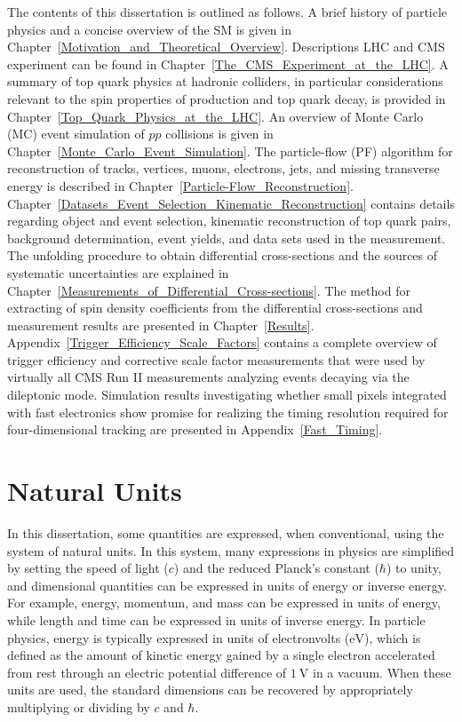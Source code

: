The contents of this dissertation is outlined as follows.
A brief history of particle physics and a concise overview of the SM is given in Chapter~\ref{Motivation_and_Theoretical_Overview}.
Descriptions LHC and CMS experiment can be found in Chapter~\ref{The_CMS_Experiment_at_the_LHC}.
A summary of top quark physics at hadronic colliders, in particular considerations relevant to the spin properties of \ttbar production and top quark decay, is provided in Chapter~\ref{Top_Quark_Physics_at_the_LHC}. 
An overview of Monte Carlo (MC) event simulation of $pp$ collisions is given in Chapter~\ref{Monte_Carlo_Event_Simulation}.
The particle-flow (PF) algorithm for reconstruction of tracks, vertices, muons, electrons, jets, and missing transverse energy is described in Chapter~\ref{Particle-Flow_Reconstruction}.
Chapter~\ref{Datasets_Event_Selection_Kinematic_Reconstruction} contains details regarding object and event selection, kinematic reconstruction of top quark pairs, background determination, event yields, and data sets used in the measurement.
The unfolding procedure to obtain differential cross-sections and the sources of systematic uncertainties are explained in Chapter~\ref{Measurements_of_Differential_Cross-sections}.
The method for extracting of spin density coefficients from the differential cross-sections and measurement results are presented in Chapter~\ref{Results}.
Appendix~\ref{Trigger_Efficiency_Scale_Factors} contains a complete overview of trigger efficiency and corrective scale factor measurements that were used by virtually all CMS Run II measurements analyzing \ttbar events decaying via the dileptonic mode.
Simulation results investigating whether small pixels integrated with fast electronics show promise for realizing the timing resolution required for four-dimensional tracking are presented in Appendix~\ref{Fast_Timing}.

\section{Natural Units}
In this dissertation, some quantities are expressed, when conventional, using the system of natural units.
In this system, many expressions in physics are simplified by setting the speed of light ($c$) and the reduced Planck's constant ($\hbar$) to unity, and dimensional quantities can be expressed in units of energy or inverse energy.
For example, energy, momentum, and mass can be expressed in units of energy, while length and time can be expressed in units of inverse energy.
In particle physics, energy is typically expressed in units of electronvolts ($\si{\eV}$), which is defined as the amount of kinetic energy gained by a single electron accelerated from rest through an electric potential difference of $\SI{1}{\V}$ in a vacuum.
When these units are used, the standard dimensions can be recovered by appropriately multiplying or dividing by $c$ and $\hbar$.